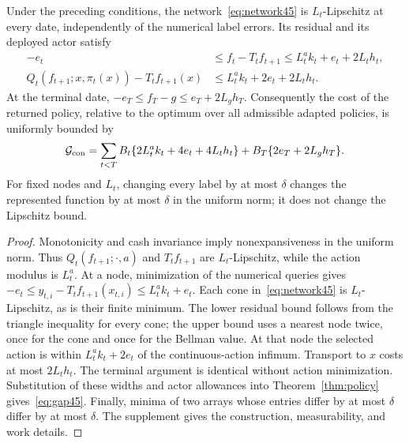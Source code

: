 \begin{theorem}\label{thm:constructive45}
Under the preceding conditions, the network~\eqref{eq:network45} is $L_t$-Lipschitz at every date, independently of the numerical label errors. Its residual and its deployed actor satisfy
\begin{align}\label{eq:residual45}
 -e_t\ &\le f_t-T_tf_{t+1}\le L^a_tk_t+e_t+2L_th_t,\\
 Q_t(f_{t+1};x,\pi_t(x))-T_tf_{t+1}(x)&\le L^a_tk_t+2e_t+2L_th_t.\label{eq:actor45}
\end{align}
At the terminal date, $-e_T\le f_T-g\le e_T+2L_gh_T$. Consequently the cost of the returned policy, relative to the optimum over all admissible adapted policies, is uniformly bounded by
\begin{equation}\label{eq:gap45}
 \mathcal G_{\rm con}=
 \sum_{t<T}B_t\{2L^a_tk_t+4e_t+4L_th_t\}
       +B_T\{2e_T+2L_gh_T\}.
\end{equation}
For fixed nodes and $L_t$, changing every label by at most $\delta$ changes the represented function by at most $\delta$ in the uniform norm; it does not change the Lipschitz bound.
\end{theorem}

\begin{proof}
Monotonicity and cash invariance imply nonexpansiveness in the uniform norm. Thus $Q_t(f_{t+1};\cdot,a)$ and $T_tf_{t+1}$ are $L_t$-Lipschitz, while the action modulus is $L^a_t$. At a node, minimization of the numerical queries gives
$-e_t\le y_{t,i}-T_tf_{t+1}(x_{t,i})\le L^a_tk_t+e_t$.
Each cone in~\eqref{eq:network45} is $L_t$-Lipschitz, as is their finite minimum. The lower residual bound follows from the triangle inequality for every cone; the upper bound uses a nearest node twice, once for the cone and once for the Bellman value. At that node the selected action is within $L^a_tk_t+2e_t$ of the continuous-action infimum. Transport to $x$ costs at most $2L_th_t$. The terminal argument is identical without action minimization. Substitution of these widths and actor allowances into Theorem~\ref{thm:policy} gives~\eqref{eq:gap45}. Finally, minima of two arrays whose entries differ by at most $\delta$ differ by at most $\delta$. The supplement gives the construction, measurability, and work details.
\end{proof}

